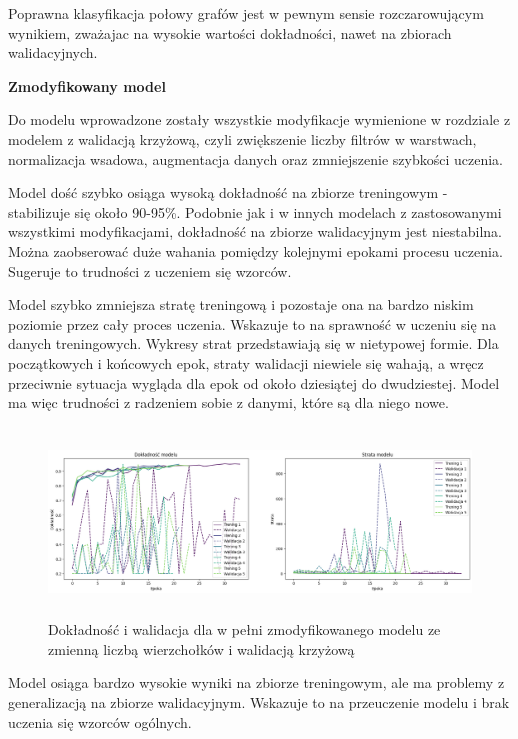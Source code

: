 Poprawna klasyfikacja połowy grafów jest w pewnym sensie rozczarowującym wynikiem,
zważajac na wysokie wartości dokładności, nawet na zbiorach walidacyjnych.

\textbf{Zmodyfikowany model}

Do modelu wprowadzone zostały wszystkie modyfikacje wymienione w rozdziale z modelem z walidacją krzyżową,
czyli zwiększenie liczby filtrów w warstwach, normalizacja wsadowa, augmentacja danych oraz zmniejszenie szybkości uczenia.

Model dość szybko osiąga wysoką dokładność na zbiorze treningowym - stabilizuje się około 90-95\%.
Podobnie jak i w innych modelach z zastosowanymi wszystkimi modyfikacjami,
dokładność na zbiorze walidacyjnym jest niestabilna.
Można zaobserować duże wahania pomiędzy kolejnymi epokami procesu uczenia.
Sugeruje to trudności z uczeniem się wzorców.

Model szybko zmniejsza stratę treningową i pozostaje ona na bardzo niskim poziomie przez cały proces uczenia.
Wskazuje to na sprawność w uczeniu się na danych treningowych.
Wykresy strat przedstawiają się w nietypowej formie.
Dla początkowych i końcowych epok, straty walidacji niewiele się wahają,
a wręcz przeciwnie sytuacja wygląda dla epok od około dziesiątej do dwudziestej.
Model ma więc trudności z radzeniem sobie z danymi, które są dla niego nowe.

\begin{figure}[ht]
	\centering
	\includegraphics[height=5cm]{resources/tests/images/v4/multiple_edges_crossvalid_img.png}
	\caption{Dokładność i walidacja dla w pełni zmodyfikowanego modelu ze zmienną liczbą wierzchołków i walidacją krzyżową}
	\label{Fig:tests-csvar-2a}
\end{figure}
\FloatBarrier

Model osiąga bardzo wysokie wyniki na zbiorze treningowym,
ale ma problemy z generalizacją na zbiorze walidacyjnym.
Wskazuje to na przeuczenie modelu i brak uczenia się wzorców ogólnych.

